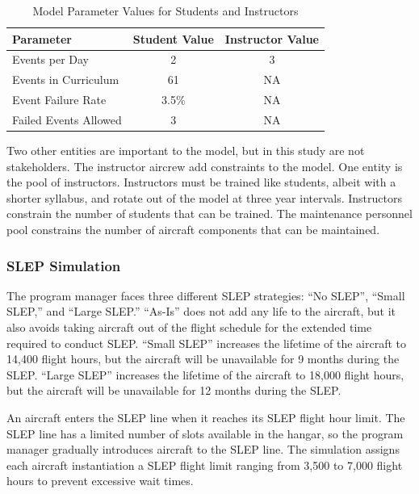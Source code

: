 \documentclass[preprint,12pt]{elsarticle}
\begin{document}
\begin{table}[h]
  \caption{Model Parameter Values for Students and Instructors}
  \label{t:aircrewParams}
  \begin{center}
  \begin{tabular}{l c c}
    \hline
    \hline
    \textbf{Parameter} & \textbf{Student Value} & \textbf{Instructor Value} \\
    \hline
    Events per Day & 2 & 3 \\
    Events in Curriculum & 61 & NA \\
    Event Failure Rate & 3.5\% & NA \\
    Failed Events Allowed & 3 & NA \\
    \hline
  \end{tabular}
  \end{center}
\end{table}

Two other entities are important to the model, but in this study are
not stakeholders. The instructor aircrew  add
constraints to the model. One entity is the pool of
instructors. Instructors must be trained like students, albeit with a
shorter syllabus, and rotate out of the model at three year
intervals. Instructors constrain the number of students that can be
trained. The maintenance personnel pool constrains the number of
aircraft components that can be maintained.

\subsubsection{SLEP Simulation}

The program manager faces three different SLEP strategies: ``No
SLEP'', ``Small SLEP,'' and ``Large SLEP.'' ``As-Is'' does not add any
life to the aircraft, but it also avoids 
taking aircraft out of the flight schedule for the extended time
required to conduct SLEP. ``Small SLEP'' increases the 
lifetime of the aircraft to 14,400 flight hours, 
but the aircraft will be unavailable for 9 months during the
SLEP. ``Large SLEP'' increases the lifetime of the
aircraft to 18,000 flight hours, but the aircraft will be unavailable for
12 months during the SLEP.

An aircraft enters the SLEP line when it reaches its SLEP flight hour
limit. The SLEP line has a limited number of slots available in the
hangar, so the program manager gradually introduces aircraft to the
SLEP line. The simulation assigns each aircraft instantiation a SLEP
flight limit ranging from 3,500  to 7,000 flight hours to prevent
excessive wait times.  
\end{document}
